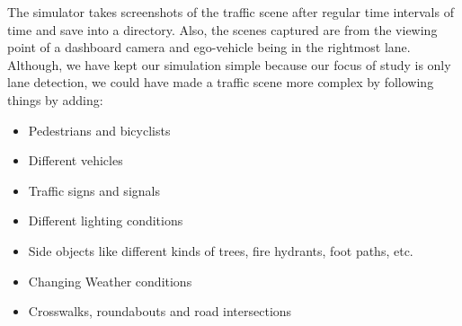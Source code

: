 The simulator takes screenshots of the traffic scene after regular time intervals of time and save into a directory. Also, the scenes captured are from the viewing point of a dashboard camera and ego-vehicle being in the rightmost lane. Although, we have kept our simulation simple because our focus of study is only lane detection, we could have made a traffic scene more complex by following things by adding:
\begin{itemize}
  \item Pedestrians and bicyclists
  \item Different vehicles
  \item Traffic signs and signals
  \item Different lighting conditions
  \item Side objects like different kinds of trees, fire hydrants, foot paths, etc.
  \item Changing Weather conditions
  \item Crosswalks, roundabouts and road intersections
\end{itemize}

